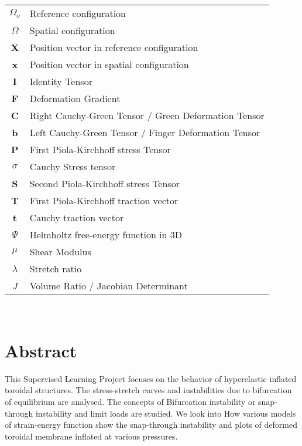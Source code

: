 \documentclass[12pt]{report}
\begin{document}
\begin{tabular}{cp{}}
    $\Omega_{o}$ & Reference configuration\\
    $\Omega$ & Spatial configuration\\
    \textbf{X} & Position vector in reference configuration\\
    \textbf{x} & Position vector in spatial configuration\\
    \textbf{I} & Identity Tensor\\
    \textbf{F} & Deformation Gradient \\
    \textbf{C} & Right Cauchy-Green Tensor / Green Deformation Tensor\\
    \textbf{b} & Left Cauchy-Green Tensor / Finger Deformation Tensor\\
    \textbf{P} & First Piola-Kirchhoff stress Tensor\\
    $\sigma$ & Cauchy Stress tensor \\
    \textbf{S} & Second Piola-Kirchhoff stress Tensor\\
    \textbf{T} & First Piola-Kirchhoff traction vector\\
    \textbf{t} & Cauchy traction vector\\
    $\Psi$ & Helmholtz free-energy function in 3D \\
    $\mu$ & Shear Modulus\\
    $\lambda$ & Stretch ratio\\
    \textit{J} & Volume Ratio / Jacobian Determinant\\
 
\end{tabular}\\


\listoffigures
\listoftables

\newpage
{}
\setcounter{page}{1}

\section{Abstract}
This Supervised Learning Project focuses on the behavior of hyperelastic inflated toroidal structures. The stress-stretch curves and instabilities due to bifurcation of equilibrium are analysed. The concepts of Bifurcation instability or snap-through instability and limit loads are studied. We look into How various models of strain-energy function show the snap-through instability and plots of deformed toroidal membrane inflated at various pressures.
\end{document}
